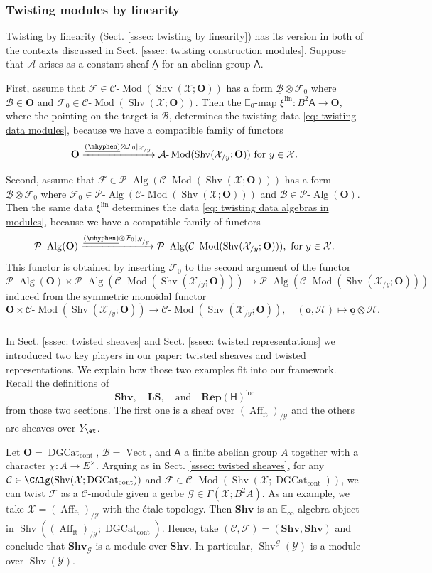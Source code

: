 \documentclass[10pt]{amsart}
\newcommand{\sssec}{\subsubsection}
\theoremstyle{remark}
\newcommand{\te}{\text}
\newcommand{\ul}{\underline}
\newcommand{\E}{\mathbb{E}}
\newcommand{\cP}{\mathcal{P}}
\newcommand{\on}{\operatorname}
\newcommand{\cA}{\mathcal{A}}
\newcommand{\cB}{\mathcal{B}}
\newcommand{\cC}{\mathcal{C}}
\newcommand{\cF}{\mathcal{F}}
\newcommand{\cG}{\mathcal{G}}
\newcommand{\cH}{\mathcal{H}}
\newcommand{\cX}{\mathcal{X}}
\newcommand{\cY}{\mathcal{Y}}
\newcommand{\DGcat}{\on{DGCat}_{\on{cont}}}
\newcommand{\lMod}{\text{-}\on{Mod}}
\newcommand{\lAlg}{\text{-}\on{Alg}}
\newcommand{\Vect}{\on{Vect}}
\newcommand{\Shv}{\on{Shv}}
\newcommand{\Affft}{\on{Aff}_{\on{ft}}}
\newcommand{\bO}{\mathbf{O}}
\newcommand{\sfA}{\mathsf{A}}
\begin{document}
\sssec{Twisting modules by linearity}\label{sssec: twisting modules by linearity}
Twisting by linearity (Sect. \ref{sssec: twisting by linearity}) has its version in both of the contexts discussed in Sect. \ref{sssec: twisting construction modules}.
Suppose that $\cA$ arises as a constant sheaf $\ul{\sfA}$ for an abelian group $\sfA$.
\medskip

First, assume that $\cF\in\cC\lMod(\Shv(\cX;\bO))$ has a form $\ul{\cB}\otimes\cF_0$ where $\cB\in\bO$ and $\cF_0\in \cC\lMod(\Shv(\cX;\bO))$.  Then the $\E_0$-map $\xi^{\on{lin}}:B^2\sfA\rightarrow \bO$, where the pointing on the target is $\cB$, determines the twisting data \eqref{eq: twisting data modules}, because we have a compatible family of functors
\[\bO\xrightarrow{\ul{(\mhyphen)}\otimes\cF_0|_{\cX_{/y}}} \cA\lMod(\Shv(\cX_{/y};\bO))\te{ for } y\in \cX.\]

Second, assume that $\cF\in\cP\lAlg(\cC\lMod(\Shv(\cX;\bO)))$ has a form $\ul{\cB}\otimes\cF_0$ where $\cF_0\in\cP\lAlg(\cC\lMod(\Shv(\cX;\bO)))$ and $\cB\in \cP\lAlg(\bO)$. Then the same data $\xi^{\on{lin}}$ determines the data \eqref{eq: twisting data algebras in modules}, because we have a compatible family of functors
\[\cP\lAlg(\bO)\xrightarrow{\ul{(\mhyphen)}\otimes\cF_0|_{\cX_{/y}}} \cP\lAlg(\cC\lMod(\Shv(\cX_{/y};\bO))),\te{ for } y\in\cX.\]
This functor is obtained by inserting $\cF_0$ to the second argument of the functor
\[\cP\lAlg(\bO)\times \cP\lAlg(\cC\lMod(\Shv(\cX_{/y};\bO)))\rightarrow \cP\lAlg(\cC\lMod(\Shv(\cX_{/y};\bO)))\]
induced from the symmetric monoidal functor
\begin{equation}\label{eq: tensoring with a constant sheaf}
    \bO\times\cC\lMod(\Shv(\cX_{/y};\bO))\rightarrow \cC\lMod(\Shv(\cX_{/y};\bO)),\quad (\mathbf{o},\cH)\mapsto \ul{\mathbf{o}}\otimes\cH.
\end{equation}

\sssec{}\label{sssec: twisting modules examples}
In Sect. \ref{sssec: twisted sheaves} and Sect. \ref{sssec: twisted representations} we introduced two key players in our paper: twisted sheaves and twisted representations. We explain how those two examples fit into our framework. Recall the definitions of \[\mathbf{Shv},\quad \mathbf{LS}, \quad  \te{and} \quad \mathbf{Rep}(\mathsf{H})^{\on{loc}}\]
from those two sections. The first one is a sheaf over $(\Affft)_{/\cY}$ and the others are sheaves over $Y_{\et}$.
\medskip

Let $\bO=\DGcat$, $\cB=\Vect$, and $\sfA$ a finite abelian group $A$ together with a character $\chi:A\rightarrow E^{\times}$. Arguing as in Sect. \ref{sssec: twisted sheaves}, for any $\cC\in\CAlg(\Shv(\cX;\DGcat))$ and $\cF\in\cC\lMod(\Shv(\cX;\DGcat))$, we can twist $\cF$ as a $\cC$-module given a gerbe $\cG\in\Gamma(\cX;B^2 A)$. As an example, we take $\cX=(\Affft)_{/\cY}$ with the \'etale topology. Then $\mathbf{Shv}$ is an $\E_{\infty}$-algebra object in $\Shv((\Affft)_{/\cY};\DGcat)$. Hence, take $(\cC,\cF)=(\mathbf{Shv},\mathbf{Shv})$ and conclude that $\mathbf{Shv}_{\cG}$ is a module over $\mathbf{Shv}$. In particular, $\Shv^{\cG}(\cY)$ is a module over $\Shv(\cY)$.
\medskip
\end{document}
